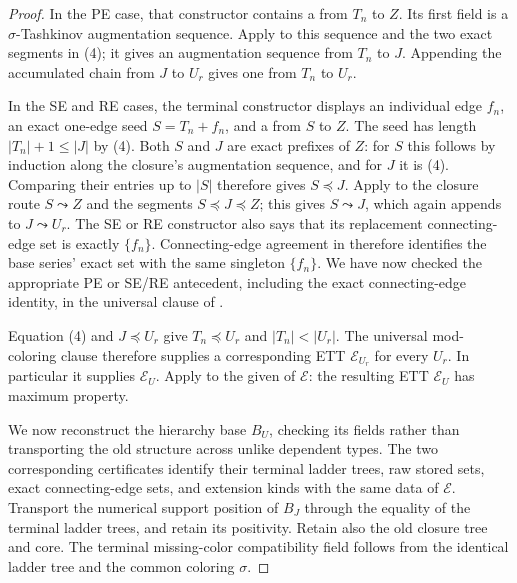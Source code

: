 \begin{proof}
In the PE case, that constructor contains a
 from $T_n$ to $Z$.  Its first field is a
$\sigma$-Tashkinov augmentation sequence.  Apply
 to this sequence and the
two exact segments in (4); it gives an augmentation sequence from $T_n$
to $J$.  Appending the accumulated chain from $J$ to $U_r$ gives one from
$T_n$ to $U_r$.

In the SE and RE cases, the terminal constructor displays an individual
edge $f_n$, an exact one-edge seed $S=T_n+f_n$, and a
 from $S$ to $Z$.  The seed has length
$|T_n|+1\leq|J|$ by (4).  Both $S$ and $J$ are exact prefixes of $Z$: for
$S$ this follows by induction along the closure's augmentation sequence,
and for $J$ it is (4).  Comparing their entries up to $|S|$ therefore gives
$S\preccurlyeq J$.  Apply
 to the closure route
$S\leadsto Z$ and the segments $S\preccurlyeq J\preccurlyeq Z$; this
gives $S\leadsto J$, which again appends to $J\leadsto U_r$.
The SE or RE constructor also says that its replacement connecting-edge
set is exactly $\{f_n\}$.  Connecting-edge agreement in
 therefore identifies the
base series' exact set with the same singleton $\{f_n\}$.  We have now
checked the appropriate PE or SE/RE antecedent, including the exact
connecting-edge identity, in the universal clause of
.

Equation (4) and $J\preccurlyeq U_r$ give
$T_n\preccurlyeq U_r$ and $|T_n|<|U_r|$.  The universal mod-coloring clause
therefore supplies a corresponding ETT $\mathcal E_{U_r}$ for every
$U_r$.  In particular it supplies $\mathcal E_U$.  Apply
 to the given
 of $\mathcal E$: the resulting ETT
$\mathcal E_U$ has maximum property.

We now reconstruct the hierarchy base $B_U$, checking its fields rather
than transporting the old structure across unlike dependent types.  The
two corresponding certificates identify their terminal ladder trees,
raw stored sets, exact connecting-edge sets, and extension kinds with the
same data of $\mathcal E$.  Transport the numerical support position of
$B_J$ through the equality of the terminal ladder trees, and retain its
positivity.  Retain also the old closure tree and core.  The terminal
missing-color compatibility field follows from the identical ladder tree
and the common coloring $\sigma$.


\end{proof}
